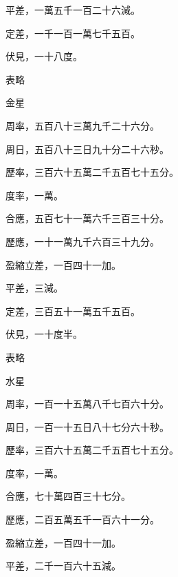 \begin{pinyinscope}
 平差，一萬五千一百二十六減。



 定差，一千一百一萬七千五百。



 伏見，一十八度。



 表略



 金星



 周率，五百八十三萬九千二十六分。



 周日，五百八十三日九十分二十六秒。



 歷率，三百六十五萬二千五百七十五分。



 度率，一萬。



 合應，五百七十一萬六千三百三十分。



 歷應，一十一萬九千六百三十九分。



 盈縮立差，一百四十一加。



 平差，三減。



 定差，三百五十一萬五千五百。



 伏見，一十度半。



 表略



 水星



 周率，一百一十五萬八千七百六十分。



 周日，一百一十五日八十七分六十秒。



 歷率，三百六十五萬二千五百七十五分。



 度率，一萬。



 合應，七十萬四百三十七分。



 歷應，二百五萬五千一百六十一分。



 盈縮立差，一百四十一加。



 平差，二千一百六十五減。




\end{pinyinscope}
